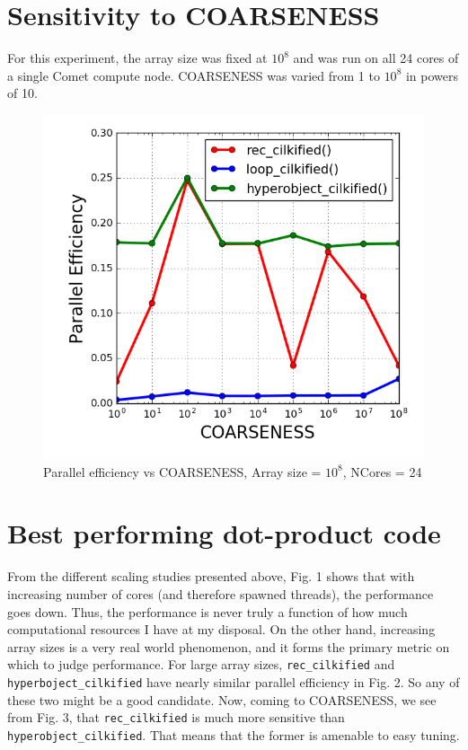 \documentclass[12pt,letterpaper]{article}
\begin{document}
\section*{Sensitivity to COARSENESS}
\noindent For this experiment, the array size was fixed at $10^8$ and was run on all 24 cores of a single Comet compute node. COARSENESS was varied from 1 to $10^8$ in powers of 10. 
%
\begin{figure}[h]
\centering
\includegraphics[scale=0.5]{coarseness_sensitivity.png}
\caption{Parallel efficiency vs COARSENESS, Array size = $10^8$, NCores = 24}
\end{figure}
%
\section*{Best performing dot-product code}
\noindent From the different scaling studies presented above, Fig. 1 shows that with increasing number of cores (and therefore spawned threads), the performance goes down. Thus, the performance is never truly a function of how much computational resources I have at my disposal. On the other hand, increasing array sizes is a very real world phenomenon, and it forms the primary metric on which to judge performance. For large array sizes, \texttt{rec\_cilkified} and \texttt{hyperboject\_cilkified} have nearly similar parallel efficiency in Fig. 2. So any of these two might be a good candidate. Now, coming to COARSENESS, we see from Fig. 3, that \texttt{rec\_cilkified} is much more sensitive than \texttt{hyperobject\_cilkified}. That means that the former is amenable to easy tuning.\\
\end{document}
